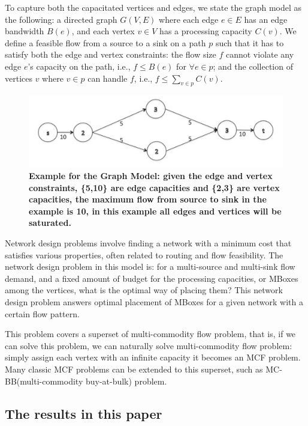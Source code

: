 \documentclass[11pt]{article}
\begin{document}
To capture both the capacitated vertices and edges, we state the graph model as the following:
a directed graph $G(V,E)$ where each edge $e\in E$ has an edge bandwidth $B(e)$, and each vertex $v\in V$ has a processing capacity $C(v)$. 
We define a feasible flow from a source to a sink on a path $p$ such that it has to satisfy both the edge and vertex constraints: the flow size $f $ cannot violate any edge $e$'s capacity on the path, i.e., $f\leq B(e)$ for $\forall e\in p$; and the collection of vertices $v$ where $v\in p$ can handle $f$, i.e., $f\leq\sum\limits_{v\in p}C(v)$. 
\begin{figure}[h]
\includegraphics[width=\linewidth]{picture1.png} 
\caption{ \textbf{Example for the Graph Model: given the edge and vertex constraints, \textnormal{\{5,10\} }are edge capacities and \{2,3\} are vertex capacities, the maximum flow from source to sink in the example is 10, in this example all edges and vertices will be saturated.} }
 \end{figure}
 
Network design problems involve finding a network with a minimum cost that satisfies various properties, often related to routing and flow feasibility. The network design problem in this model is: for a multi-source and multi-sink flow demand, and a fixed amount of budget for the processing capacities, or MBoxes among the vertices, what is the optimal way of placing them? This network design problem answers optimal placement of MBoxes for a given network with a certain flow pattern. 

This problem covers a superset of multi-commodity flow problem\cite{MCF}, that is, if we can solve this problem, we can naturally solve multi-commodity flow problem: simply assign each vertex with an infinite capacity it becomes an MCF problem. Many classic MCF problems can be extended to this superset, such as MC-BB(multi-commodity buy-at-bulk) problem\cite{BuyAtBulk,Charikar05,Chekuri2007}. 

\subsection{The results in this paper}
\end{document}
